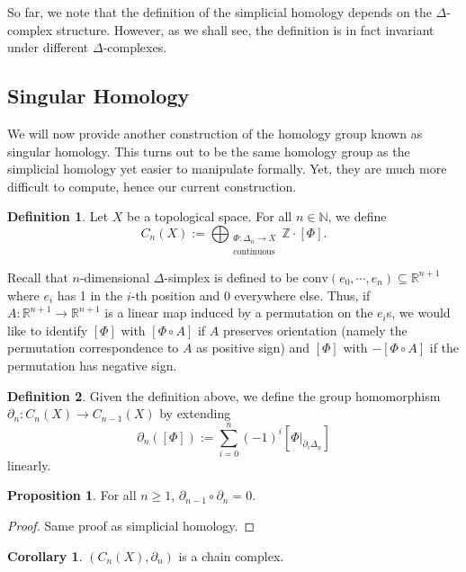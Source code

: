 \documentclass[]{article}
\theoremstyle{definition}
\newtheorem{corollary}{Corollary}[theorem]
\theoremstyle{definition}
\newtheorem{definition}{Definition}[section]
\newtheorem{proposition}{Proposition}[section]
\begin{document}
So far, we note that the definition of the simplicial homology depends on the 
\(\Delta\)-complex structure. However, as we shall see, the definition 
is in fact invariant under different \(\Delta\)-complexes. 

\subsection{Singular Homology}

We will now provide another construction of the homology group known as 
singular homology. This turns out to be the same homology group as the 
simplicial homology yet easier to manipulate formally. Yet, they are much 
more difficult to compute, hence our current construction.

\begin{definition}
  Let \(X\) be a topological space. For all \(n \in \mathbb{N}\), we define 
  \[C_n(X) := \bigoplus_{\substack{\Phi : \Delta_n \to X\\\text{continuous}}} 
    \mathbb{Z} \cdot [\Phi].\]
\end{definition}

Recall that \(n\)-dimensional \(\Delta\)-simplex is defined to be 
\(\text{conv}(e_0, \cdots, e_n) \subseteq \mathbb{R}^{n + 1}\) where \(e_i\) 
has 1 in the \(i\)-th position and 0 everywhere else. Thus, if 
\(A : \mathbb{R}^{n + 1} \to \mathbb{R}^{n + 1}\) is a linear map induced by 
a permutation on the \(e_i\)s, we would like to identify \([\Phi]\) with
\([\Phi \circ A]\) if \(A\) preserves orientation (namely the permutation 
correspondence to \(A\) as positive sign) and \([\Phi]\) with \(-[\Phi \circ A]\) 
if the permutation has negative sign. 

\begin{definition}
  Given the definition above, we define the group homomorphism 
  \(\partial_n : C_n(X) \to C_{n - 1}(X)\) by extending
  \[\partial_n ([\Phi]) := \sum_{i = 0}^n (-1)^i [\Phi|_{\partial_i \Delta_n}]\]
  linearly.
\end{definition}

\begin{proposition}
  For all \(n \ge 1\), \(\partial_{n - 1} \circ \partial_n = 0\).
\end{proposition}
\begin{proof}
  Same proof as simplicial homology.
\end{proof}

\begin{corollary}
  \((C_n(X), \partial_n)\) is a chain complex.
\end{corollary}
\end{document}
